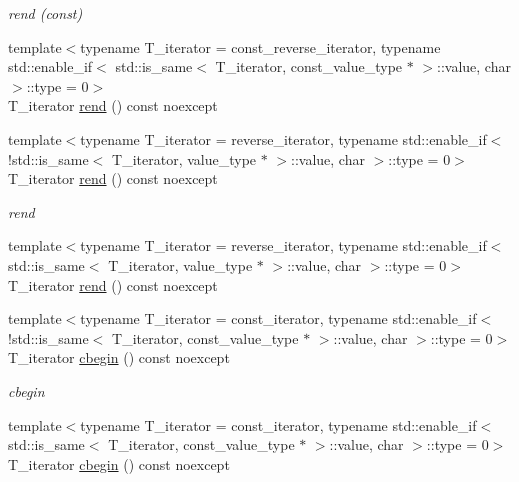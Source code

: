 \begin{DoxyCompactItemize}
\begin{DoxyCompactList}\small\item\em rend (const) \end{DoxyCompactList}\item 
{\footnotesize template$<$typename T\+\_\+iterator  = const\+\_\+reverse\+\_\+iterator, typename std\+::enable\+\_\+if$<$ std\+::is\+\_\+same$<$ T\+\_\+iterator, const\+\_\+value\+\_\+type $\ast$ $>$\+::value, char $>$\+::type  = 0$>$ }\\T\+\_\+iterator \hyperlink{classIceBRG_1_1labeled__array__col__reference_aea119e7ca31efc687e57ede7f9e663dc}{rend} () const  noexcept
\item 
{\footnotesize template$<$typename T\+\_\+iterator  = reverse\+\_\+iterator, typename std\+::enable\+\_\+if$<$!std\+::is\+\_\+same$<$ T\+\_\+iterator, value\+\_\+type $\ast$ $>$\+::value, char $>$\+::type  = 0$>$ }\\T\+\_\+iterator \hyperlink{classIceBRG_1_1labeled__array__col__reference_aea119e7ca31efc687e57ede7f9e663dc}{rend} () const  noexcept
\begin{DoxyCompactList}\small\item\em rend \end{DoxyCompactList}\item 
{\footnotesize template$<$typename T\+\_\+iterator  = reverse\+\_\+iterator, typename std\+::enable\+\_\+if$<$ std\+::is\+\_\+same$<$ T\+\_\+iterator, value\+\_\+type $\ast$ $>$\+::value, char $>$\+::type  = 0$>$ }\\T\+\_\+iterator \hyperlink{classIceBRG_1_1labeled__array__col__reference_aea119e7ca31efc687e57ede7f9e663dc}{rend} () const  noexcept
\item 
{\footnotesize template$<$typename T\+\_\+iterator  = const\+\_\+iterator, typename std\+::enable\+\_\+if$<$!std\+::is\+\_\+same$<$ T\+\_\+iterator, const\+\_\+value\+\_\+type $\ast$ $>$\+::value, char $>$\+::type  = 0$>$ }\\T\+\_\+iterator \hyperlink{classIceBRG_1_1labeled__array__col__reference_aeeb0d8f9610b7050480b56154b0d1c0e}{cbegin} () const  noexcept
\begin{DoxyCompactList}\small\item\em cbegin \end{DoxyCompactList}\item 
{\footnotesize template$<$typename T\+\_\+iterator  = const\+\_\+iterator, typename std\+::enable\+\_\+if$<$ std\+::is\+\_\+same$<$ T\+\_\+iterator, const\+\_\+value\+\_\+type $\ast$ $>$\+::value, char $>$\+::type  = 0$>$ }\\T\+\_\+iterator \hyperlink{classIceBRG_1_1labeled__array__col__reference_aeeb0d8f9610b7050480b56154b0d1c0e}{cbegin} () const  noexcept

\end{DoxyCompactItemize}
